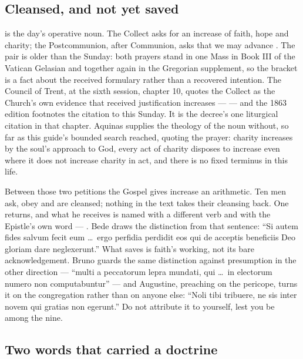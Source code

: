 \subsection*{Cleansed, and not yet saved}

 is the day's operative noun. The Collect asks for an
increase of faith, hope and charity; the Postcommunion, after Communion, asks
that we may advance . The pair
is older than the Sunday: both prayers stand in one Mass in Book III of the
Vatican Gelasian and together again in the Gregorian supplement, so the
bracket is a fact about the received formulary rather than a recovered
intention. The Council of Trent, at the sixth session, chapter 10, quotes the
Collect as the Church's own evidence that received justification increases ---
 --- and the 1863 edition
footnotes the citation to this Sunday. It is the decree's one liturgical
citation in that chapter. Aquinas supplies the theology of the noun without,
so far as this guide's bounded search reached, quoting the prayer: charity
increases by the soul's approach to God, every act of charity disposes to
increase even where it does not increase charity in act, and there is no fixed
terminus in this life.

Between those two petitions the Gospel gives increase an arithmetic. Ten men
ask, obey and are cleansed; nothing in the text takes their cleansing back.
One returns, and what he receives is named with a different verb and with the
Epistle's own word --- . Bede draws the
distinction from that sentence: ``Si autem fides salvum fecit eum \dots\ ergo
perfidia perdidit eos qui de acceptis beneficiis Deo gloriam dare
neglexerunt.'' What saves is faith's working, not its bare acknowledgement.
Bruno guards the same distinction against presumption in the other direction
--- ``multi a peccatorum lepra mundati, qui \dots\ in electorum numero non
computabuntur'' --- and Augustine, preaching on the pericope, turns it on the
congregation rather than on anyone else: ``Noli tibi tribuere, ne sis inter
novem qui gratias non egerunt.'' Do not attribute it to yourself, lest you be
among the nine.

\subsection*{Two words that carried a doctrine}

